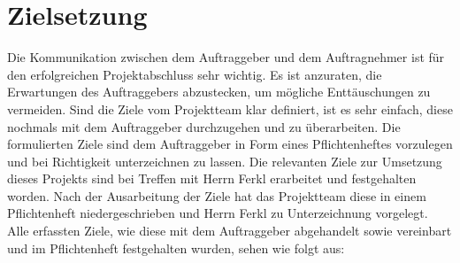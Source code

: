 \section{Zielsetzung}
Die Kommunikation zwischen dem Auftraggeber und dem Auftragnehmer ist für den erfolgreichen Projektabschluss sehr wichtig. Es ist anzuraten, die Erwartungen des Auftraggebers abzustecken, um mögliche Enttäuschungen zu vermeiden. Sind die Ziele vom Projektteam klar definiert, ist es sehr einfach, diese nochmals mit dem Auftraggeber durchzugehen und zu überarbeiten. Die formulierten Ziele sind dem Auftraggeber in Form eines Pflichtenheftes vorzulegen und bei Richtigkeit unterzeichnen zu lassen.
Die relevanten Ziele zur Umsetzung dieses Projekts sind bei Treffen mit Herrn Ferkl erarbeitet und festgehalten worden. Nach der Ausarbeitung der Ziele hat das Projektteam diese in einem Pflichtenheft niedergeschrieben und Herrn Ferkl zu Unterzeichnung vorgelegt. Alle erfassten Ziele, wie diese mit dem Auftraggeber abgehandelt sowie vereinbart und im Pflichtenheft festgehalten wurden, sehen wie folgt aus:


